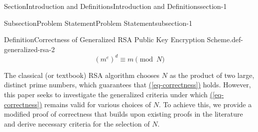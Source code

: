 \documentclass[oneside,12pt,]{article}
\newcommand{\xreffont}{\relax}
\numberwithin{equation}{section}
\begin{document}
\begin{sectionptx}{Section}{Introduction and Definitions}{}{Introduction and Definitions}{}{}{section-1}
\begin{subsectionptx}{Subsection}{Problem Statement}{}{Problem Statement}{}{}{subsection-1}
\begin{definition}{Definition}{Correctness of Generalized RSA Public Key Encryption Scheme.}{def-generalized-rsa-2}
%
\begin{equation}
(m^e)^d \equiv m \pmod{N}\label{def-generalized-rsa-2-2-5}
\end{equation}
\end{definition}
The classical (or textbook) RSA algorithm chooses \(N\) as the product of two large, distinct prime numbers, which guarantees that \hyperref[eq-correctness]{({\xreffont\ref{eq-correctness}})} holds. However, this paper seeks to investigate the generalized criteria under which \hyperref[eq-correctness]{({\xreffont\ref{eq-correctness}})} remains valid for various choices of \(N\). To achieve this, we provide a modified proof of correctness that builds upon existing proofs in the literature and derive necessary criteria for the selection of \(N\).%
\end{subsectionptx}
\end{sectionptx}
%
%
\typeout{************************************************}
\typeout{************************************************}
%
\end{document}
